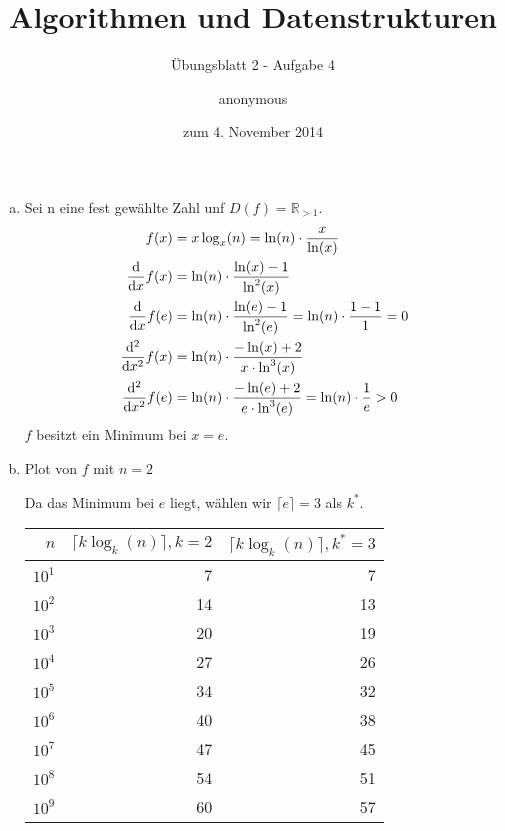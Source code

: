 \documentclass[a4paper]{scrartcl}
\title{Algorithmen und Datenstrukturen}
\subtitle{Übungsblatt 2 - Aufgabe 4}
\author{
    anonymous
}
\date{zum 4. November 2014}
\begin{document}
\maketitle

\begin{enumerate}[(a)]
    \item Sei n eine fest gewählte Zahl unf $D(f) = \mathbb{R}_{>1}$.
        \begin{align}
            f(x) &= x \log_x (n) = \ln(n) \cdot \frac{x}{\ln(x)} \\
            \frac{\dif}{\dif x} f(x) &= \ln(n) \cdot \frac{\ln(x)-1}{\ln^2(x)} \\
            \frac{\dif}{\dif x} f(e) &= \ln(n) \cdot \frac{\ln(e)-1}{\ln^2(e)}
            = \ln(n) \cdot \frac{1-1}{1} = 0 \\
            \frac{\dif^2}{\dif x^2} f(x) &= \ln(n) \cdot \frac{-\ln(x)+2}{x \cdot \ln^3(x)} \\
            \frac{\dif^2}{\dif x^2} f(e) &= \ln(n) \cdot \frac{-\ln(e)+2}{e \cdot \ln^3(e)}
            = \ln(n) \cdot \frac{1}{e} > 0
        \end{align}
        $f$ besitzt ein Minimum bei $x=e$.

    \item Plot von $f$ mit $n=2$
        \begin{center}
        \end{center}
        Da das Minimum bei $e$ liegt, wählen wir $\lceil e \rceil = 3$ als $k^*$. \\
        \begin{tabular}{r|r|r}
            $n$    & $\lceil k \log_k (n) \rceil, k=2$ & $\lceil k \log_k (n) \rceil, k^* = 3$ \\ \hline
            $10^1$ &\num{7}  &\num{7}  \\
            $10^2$ &\num{14} &\num{13} \\
            $10^3$ &\num{20} &\num{19} \\
            $10^4$ &\num{27} &\num{26} \\
            $10^5$ &\num{34} &\num{32} \\
            $10^6$ &\num{40} &\num{38} \\
            $10^7$ &\num{47} &\num{45} \\
            $10^8$ &\num{54} &\num{51} \\
            $10^9$ &\num{60} &\num{57} \\
        \end{tabular}


\end{enumerate}
\end{document}
